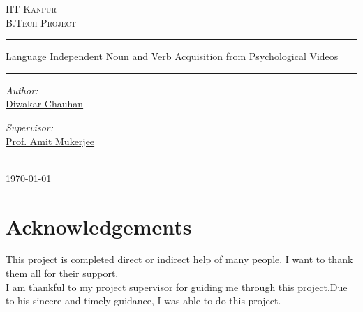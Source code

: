 \def\DevnagVersion{2.15}\documentclass[a4paper, 11pt, notitlepage]{report}
\author{Diwakar Chauhan} %
\date{\today} %
\begin{document}
\begin{center}

{\color{blue}  \textsc{\LARGE IIT Kanpur}\\[1.5cm] }
\textsc{\Large B.Tech Project}\\[1cm]
\hrule height 2pt
\vspace*{10pt}
{\huge  Language Independent Noun and Verb Acquisition from Psychological Videos}\\[0.4cm] 
\hrule height 2pt 
\vspace*{10pt}
\begin{minipage}{0.4\textwidth}
\begin{flushleft} \large
\emph{Author:}\\
{\color{blue} \href{http://home.iitk.ac.in/~diwakarc}{Diwakar Chauhan} }
\end{flushleft}
\end{minipage}
\begin{minipage}{0.4\textwidth}
\begin{flushright} \large
\emph{Supervisor:} \\
{\color{blue} \href{http://www.cse.iitk.ac.in/users/amit}{Prof. Amit Mukerjee } }%
\end{flushright}
\end{minipage}\\[3cm]


{\large \today}\\[4cm] %

\end{center}

\thispagestyle{empty}

\newpage
\section*{Acknowledgements}

\hspace*{30pt} This project is completed direct or indirect help of many people. I want to thank them all for their support.\\

\hspace*{10pt} I am thankful to my project supervisor for guiding me through this project.Due to his sincere and timely guidance, I was able to do this project.\\
\end{document}
